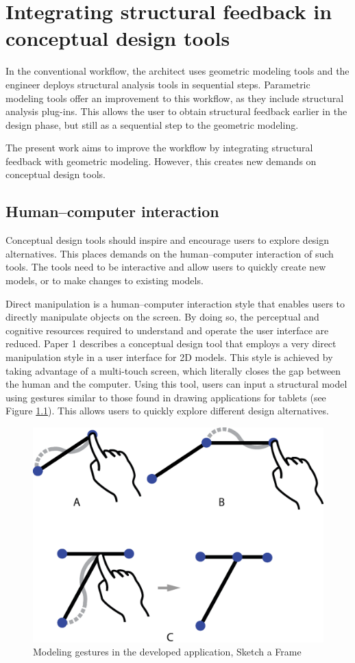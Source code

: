 \chapter{Integrating structural feedback in conceptual design tools}
\label{ch:Integrating structural feedback}
In the conventional workflow, the architect uses geometric modeling tools and the engineer deploys structural analysis tools in sequential steps. Parametric modeling tools offer an improvement to this workflow, as they include structural analysis plug-ins. This allows the user to obtain structural feedback earlier in the design phase, but still as a sequential step to the geometric modeling.

The present work aims to improve the workflow by integrating structural feedback with geometric modeling. However, this creates new demands on conceptual design tools. 

\section{Human--computer interaction}
Conceptual design tools should inspire and encourage users to explore design alternatives. This places demands on the human--computer interaction of such tools. The tools need to be interactive and allow users to quickly create new models, or to make changes to existing models. 

Direct manipulation is a human--computer interaction style that enables users to directly manipulate objects on the screen. By doing so, the perceptual and cognitive resources required to understand and operate the user interface are reduced. Paper 1 describes a conceptual design tool that employs a very direct manipulation style in a user interface for 2D models. This style is achieved by taking advantage of a multi-touch screen, which literally closes the gap between the human and the computer. Using this tool, users can input a structural model using gestures similar to those found in drawing applications for tablets (see Figure \ref{fig:interaction}). This allows users to quickly explore different design alternatives.

\begin{figure}
  \includegraphics[width=330pt]{graphics/interaction.eps}
  \caption{Modeling gestures in the developed application, Sketch a Frame}
  \label{fig:interaction}
\end{figure}

